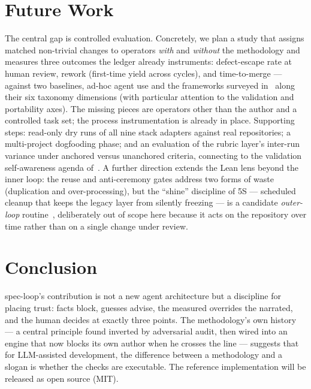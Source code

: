 \documentclass[11pt]{article}
\begin{document}
\section{Future Work}\label{sec:future}

The central gap is controlled evaluation. Concretely, we plan a study that
assigns matched non-trivial changes to operators \emph{with} and \emph{without}
the methodology and measures three outcomes the ledger already instruments:
defect-escape rate at human review, rework (first-time yield across cycles),
and time-to-merge --- against two baselines, ad-hoc agent use and the
frameworks surveyed in~\cite{demacedo2026prompt} along their six taxonomy
dimensions (with particular attention to the validation and portability axes).
The missing pieces are operators other than the author and a controlled task
set; the process instrumentation is already in place. Supporting steps:
read-only dry runs of all nine stack adapters against real repositories; a
multi-project dogfooding phase; and an evaluation of the rubric layer's
inter-run variance under anchored versus unanchored criteria, connecting to the
validation self-awareness agenda of~\cite{ma2026building}. A further direction extends the Lean lens beyond the
inner loop: the reuse and anti-ceremony gates address two forms of waste
(duplication and over-processing), but the ``shine'' discipline of 5S ---
scheduled cleanup that keeps the legacy layer from silently freezing --- is a
candidate \emph{outer-loop} routine~\cite{poppendieck2006lean}, deliberately
out of scope here because it acts on the repository over time rather than on a
single change under review.

\section{Conclusion}\label{sec:conclusion}

spec-loop's contribution is not a new agent architecture but a discipline for
placing trust: facts block, guesses advise, the measured overrides the
narrated, and the human decides at exactly three points. The methodology's own
history --- a central principle found inverted by adversarial audit, then
wired into an engine that now blocks its own author when he crosses the line
--- suggests that for LLM-assisted development, the difference between a
methodology and a slogan is whether the checks are executable. The reference
implementation will be released as open source (MIT).
\end{document}
